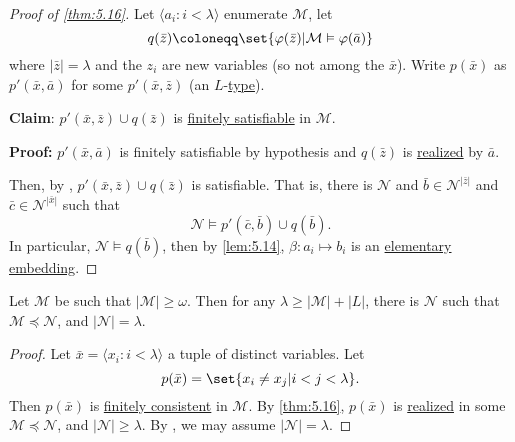 \documentclass{article}
\let\models\vDash
\begin{document}
\begin{proof}[Proof of \cref{thm:5.16}]
  Let $\langle a_i : i < \lambda \rangle$ enumerate $\mathcal{M}$, let
  \begin{equation*}q(\bar{z}) \coloneqq \set{\varphi(\bar{z}) | \mathcal{M} \models \varphi(\bar{a})}\end{equation*}
  where $|\bar{z}| = \lambda$ and the $z_i$ are new variables (so not among the $\bar{x}$).
  Write $p(\bar{x})$ as $p'(\bar{x}, \bar{a})$ for some $p'(\bar{x}, \bar{z})$ (an $L$-\hyperlink{def:type}{type}).

  \textbf{Claim}: $p'(\bar{x},\bar{z}) \cup q(\bar{z})$ is \hyperlink{def:type}{finitely satisfiable} in $\mathcal{M}$.

  \textbf{Proof:} $p'(\bar{x},\bar{a})$ is finitely satisfiable by hypothesis and $q(\bar{z})$ is \hyperlink{def:type}{realized} by $\bar{a}$.

  Then, by , $p'(\bar{x}, \bar{z}) \cup q(\bar{z})$ is satisfiable.
  That is, there is $\mathcal{N}$ and $\bar{b} \in \mathcal{N}^{|\bar{z}|}$ and $\bar{c} \in \mathcal{N}^{|\bar{x}|}$ such that
  \begin{equation*}
    \mathcal{N} \models p'(\bar{c}, \bar{b}) \cup q(\bar{b}).
  \end{equation*}
  In particular, $\mathcal{N} \models q(\bar{b})$, then by \cref{lem:5.14}, $\beta: a_i \mapsto b_i$ is an \hyperlink{def:el}{elementary embedding}.
\end{proof}
\begin{nthm}\label{thm:5.17}
  Let $\mathcal{M}$ be such that $|\mathcal{M}| \geq \omega$.
  Then for any $\lambda \geq |\mathcal{M}| + |L|$, there is $\mathcal{N}$ such that \hyperlink{def:elsubs}{$\mathcal{M} \preccurlyeq \mathcal{N}$}, and $|\mathcal{N}| = \lambda$.
\end{nthm}
\begin{proof}
  Let $\bar{x} = \langle x_i : i < \lambda \rangle$ a tuple of distinct variables.
  Let
  \begin{equation*}
    p(\bar{x}) = \set{x_i \neq x_j | i < j < \lambda}.
  \end{equation*}
  Then $p(\bar{x})$ is \hyperlink{def:type}{finitely consistent} in $\mathcal{M}$.
  By \cref{thm:5.16}, $p(\bar{x})$ is \hyperlink{def:type}{realized} in some $\mathcal{M} \preccurlyeq \mathcal{N}$, and $|\mathcal{N}| \geq \lambda$.
  By , we may assume $|\mathcal{N}| = \lambda$.
\end{proof}
\end{document}
